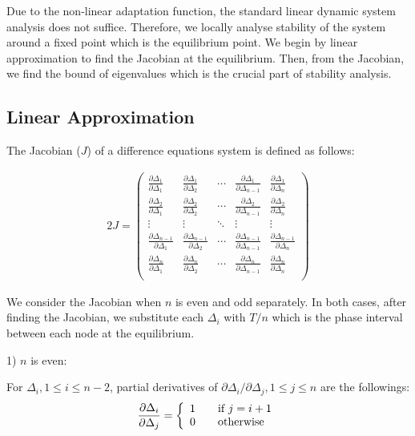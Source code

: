
Due to the non-linear adaptation function, the standard linear dynamic system analysis does not suffice.
Therefore, we locally analyse stability of the system around a fixed point which is the equilibrium point.
We begin by linear approximation to find the Jacobian at the equilibrium. Then, from the Jacobian, we find the bound of eigenvalues which is the crucial part of stability analysis.


\subsection{Linear Approximation}
The Jacobian ($J$) of a difference equations system is defined as follows:

\begin{alignat}{2}
J=\begin{pmatrix} 
{\frac{\partial \Delta_{1}}{\partial \Delta_{1}}}  & {\frac{\partial \Delta_{1}}{\partial \Delta_{2}}} & \cdots & {\frac{\partial \Delta_{1}}{\partial \Delta_{n-1}}} & {\frac{\partial \Delta_{1}}{\partial \Delta_{n}}} \\ 
{\frac{\partial \Delta_{2}}{\partial \Delta_{1}}}  & {\frac{\partial \Delta_{2}}{\partial \Delta_{2}}} & \cdots &  {\frac{\partial \Delta_{2}}{\partial \Delta_{n-1}}} & {\frac{\partial \Delta_{2}}{\partial \Delta_{n}}} \\  
\vdots & \vdots & \ddots & \vdots & \vdots \\
{\frac{\partial \Delta_{n-1}}{\partial \Delta_{1}}} & {\frac{\partial \Delta_{n-1}}{\partial \Delta_{2}}} & \cdots &  {\frac{\partial \Delta_{n-1}}{\partial \Delta_{n-1}}} & {\frac{\partial \Delta_{n-1}}{\partial \Delta_{n}}} \\  
{\frac{\partial \Delta_{n}}{\partial \Delta_{1}}} & {\frac{\partial \Delta_{n}}{\partial \Delta_{2}}} & \cdots &  {\frac{\partial \Delta_{n}}{\partial \Delta_{n-1}}} & {\frac{\partial \Delta_{n}}{\partial \Delta_{n}}} \\  
\end{pmatrix}
\end{alignat}

We consider the Jacobian when $n$ is even and odd separately. In both cases, after finding the Jacobian, we substitute each $\Delta_{i}$ with $T/n$ which is the phase interval between each node at the equilibrium.

1) $n$ is even:

For $\Delta_{i}, 1 \leq i \leq n-2$, partial derivatives of ${\partial \Delta_{i} / \partial \Delta_{j}}, 1 \leq j \leq n$ are the followings:
\begin{alignat}{1}
  {\frac{\partial \Delta_{i}}{\partial \Delta_{j}}} = \left\{ 
  \begin{array}{l l}
    1 & \quad \text{if } j = i + 1\\
    0 & \quad \text{otherwise}\\
  \end{array} \right. \nonumber
\end{alignat}


